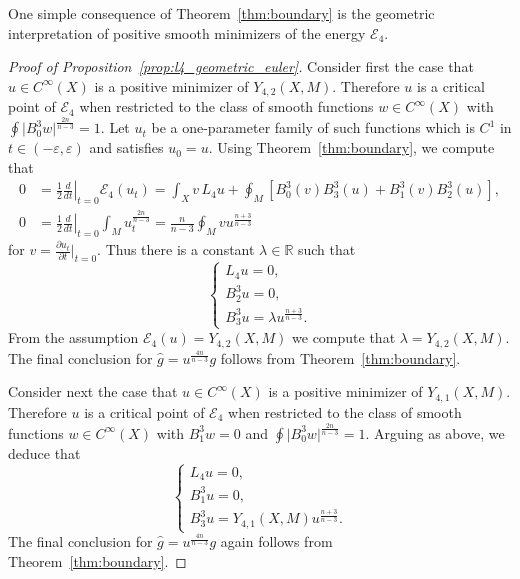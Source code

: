 \documentclass{amsart}
\theoremstyle{definition}
\theoremstyle{remark}
\numberwithin{equation}{section}
\begin{document}
One simple consequence of Theorem~\ref{thm:boundary} is the geometric interpretation of positive smooth minimizers of the energy ${\mathcal{E}}_4$.

\begin{proof}[Proof of Proposition~\ref{prop:l4_geometric_euler}]
 Consider first the case that $u\in C^\infty(X)$ is a positive minimizer of $Y_{4,2}(X,M)$.  Therefore $u$ is a critical point of ${\mathcal{E}}_4$ when restricted to the class of smooth functions $w\in C^\infty(X)$ with $\oint {\lvert} B_0^3w{\rvert}^{\frac{2n}{n-3}}=1$.  Let $u_t$ be a one-parameter family of such functions which is $C^1$ in $t\in(-\varepsilon,\varepsilon)$ and satisfies $u_0=u$.  Using Theorem~\ref{thm:boundary}, we compute that
 \begin{align*}
  0 & = \frac{1}{2}\left.\frac{d}{dt}\right|_{t=0}{\mathcal{E}}_4(u_t) = \int_X v\,L_4u + \oint_M \left[ B_0^3(v)B_3^3(u) + B_1^3(v)B_2^3(u) \right] , \\
  0 & = \frac{1}{2}\left.\frac{d}{dt}\right|_{t=0}\int_M u_t^{\frac{2n}{n-3}} = \frac{n}{n-3}\oint_M vu^{\frac{n+3}{n-3}}
 \end{align*}
 for $v=\frac{\partial u_t}{\partial t}{\rvert}_{t=0}$. Thus there is a constant $\lambda\in{\mathbb{R}}$ such that
 \begin{equation}
  \label{eqn:l4_geometric_euler}
  \begin{cases}
   L_4u = 0, \\
   B_2^3u = 0, \\
   B_3^3u = \lambda u^{\frac{n+3}{n-3}} .
  \end{cases}
 \end{equation}
 From the assumption ${\mathcal{E}}_4(u)=Y_{4,2}(X,M)$ we compute that $\lambda=Y_{4,2}(X,M)$.  The final conclusion for ${\widehat{g}}=u^{\frac{4n}{n-3}}g$ follows from Theorem~\ref{thm:boundary}.

 Consider next the case that $u\in C^\infty(X)$ is a positive minimizer of $Y_{4,1}(X,M)$.  Therefore $u$ is a critical point of ${\mathcal{E}}_4$ when restricted to the class of smooth functions $w\in C^\infty(X)$ with $B_1^3w=0$ and $\oint{\lvert} B_0^3w{\rvert}^{\frac{2n}{n-3}}=1$.  Arguing as above, we deduce that
 \[ \begin{cases}
     L_4u=0, \\
     B_1^3u=0, \\
     B_3^3u = Y_{4,1}(X,M) u^{\frac{n+3}{n-3}} .
    \end{cases} \]
 The final conclusion for ${\widehat{g}}=u^{\frac{4n}{n-3}}g$ again follows from Theorem~\ref{thm:boundary}.
\end{proof}
\end{document}
